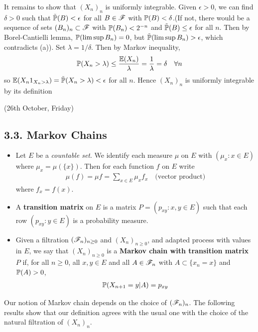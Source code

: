 \documentclass[12pt,a4paper]{report}
\newenvironment{proof}
{\begin{changemargin}{1cm}{0.5cm} 
	}%
	{\end{changemargin}
}
\begin{document}
\begin{proof}
\quad It remains to show that $(X_n)_n$ is uniformly integrable. Given $\epsilon >0$, we can find $\delta >0$ such that $\tilde{\mathbb{P}}(B) <\epsilon$ for all $B \in \mathscr{F}$ with $\mathbb{P} (B) <\delta$.(If not, there would be a sequence of sets $(B_n)_{n} \subset \mathscr{F}$ with $\mathbb{P}(B_n)<2^{-n}$ and $\tilde{\mathbb{P}}(B) \leq \epsilon$ for all $n$. Then by Borel-Cantielli lemma, $\mathbb{P}(\limsup B_n) =0$, but $\tilde{\mathbb{P}}(\limsup B_n) >\epsilon$, which contradicts (a)). Set $\lambda = 1/\delta$. Then by Markov inequality,
\begin{align*}
\mathbb{P}(X_n > \lambda) \leq \frac{\mathbb{E}(X_n)}{\lambda} = \frac{1}{\lambda} = \delta \quad \forall n
\end{align*}
so $\mathbb{E}(X_n 1_{X_n > \lambda}) = \tilde{\mathbb{P}}(X_n > \lambda) < \epsilon$ for all $n$. Hence $(X_n)_n$ is uniformly integrable by its definition

\eop
\end{proof}
\s

\newday

(26th October, Friday)
\s

\subsection*{3.3. Markov Chains}

\begin{itemize}
\item Let $E$ be a \emph{countable set}. We identify each measure $\mu$ on $E$ with $(\mu_x : x\in E)$ where $\mu_x = \mu(\{x\})$. Then for each function $f$ on $E$ write
\begin{align*}
\mu(f) = \mu f = \sum_{x\in E} \mu_x f_x \quad \text{(vector product)}
\end{align*}
where $f_x = f(x)$.
\item A \textbf{transition matrix} on $E$ is a matrix $P=(p_{xy}:x,y\in E)$ such that each row $(p_{xy}:y\in E)$ is a probability measure.
\item Given a filtration $(\mathscr{F}_n)_{n\geq 0}$ and $(X_n)_{n\geq 0}$, and adapted process with values in $E$, we say that $(X_n)_{n\geq 0}$ is a \textbf{Markov chain with transition matrix $P$} if, for all $n\geq 0$, all $x,y\in E$ and all $A\in \mathscr{F}_n$ with $A\subset \{x_n =x \}$ and $\mathbb{P}(A)>0$,
\begin{align*}
\mathbb{P}(X_{n+1} =y |A) = p_{xy}
\end{align*}
\end{itemize}
Our notion of Markov chain depends on the choice of $(\mathscr{F}_n)_n$. The following results show that our definition agrees with the usual one with the choice of the natural filtration of $(X_n)_n$.
\s
\end{document}
